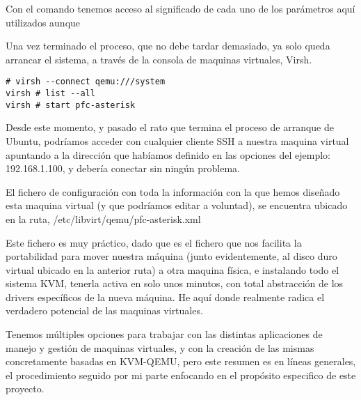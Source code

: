 Con el comando  tenemos acceso  al significado de cada uno de los parámetros aquí utilizados aunque 

Una vez terminado el proceso, que no debe tardar demasiado, ya solo queda arrancar el sistema, a través de la consola de maquinas virtuales, Virsh.

\begin{lstlisting}[style=consola]
# virsh --connect qemu:///system
virsh # list --all
virsh # start pfc-asterisk
\end{lstlisting}

Desde este momento, y pasado el rato que termina el proceso de arranque de Ubuntu, podríamos acceder con cualquier cliente SSH a nuestra maquina virtual apuntando a la dirección que habíamos definido en las opciones del ejemplo: 192.168.1.100, y debería conectar sin ningún problema. 

El fichero de configuración con toda la información con la que hemos diseñado esta maquina virtual (y que podríamos editar a voluntad), se encuentra ubicado en la ruta, /etc/libvirt/qemu/pfc-asterisk.xml

Este fichero es muy práctico, dado que es el fichero que nos facilita la portabilidad para mover nuestra máquina (junto evidentemente, al disco duro virtual ubicado en la anterior ruta) a otra maquina física, e instalando todo el sistema KVM, tenerla activa en solo unos minutos, con total abstracción de los drivers específicos de la nueva máquina. He aquí donde realmente radica el verdadero potencial de las maquinas virtuales.

Tenemos múltiples opciones para trabajar con las distintas aplicaciones de manejo y gestión de maquinas virtuales, y con la creación de las mismas concretamente basadas en KVM-QEMU, pero este resumen es en líneas generales, el procedimiento seguido por mi parte enfocando en el propósito especifico de este proyecto.

